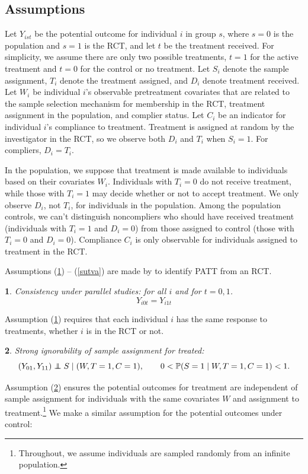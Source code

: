 \documentclass[12pt]{article}
\makeatletter
\newtheorem*{assumption*}{\assumptionnumber}
\providecommand{\assumptionnumber}{}
\newenvironment{assumption}[2]
 {%
  \renewcommand{\assumptionnumber}{Assumption #1}%
  \begin{assumption*}%
  \protected@edef\@currentlabel{#1}%
 }
 {%
  \end{assumption*}
 }
\newcommand{\pr}{\mathbb{P}} %
\newcommand\independent{\protect\mathpalette{\protect\independenT}{\perp}}
\def\independenT#1#2{\mathrel{\rlap{$#1#2$}\mkern2mu{#1#2}}}
\makeatother
\begin{document}
\subsection{Assumptions} 
Let $Y_{ist}$ be the potential outcome for individual $i$ in group $s$, where $s=0$ is the population and $s=1$ is the RCT, and let $t$ be the treatment received.  For simplicity, we assume there are only two possible treatments, $t=1$ for the active treatment and $t=0$ for the control or no treatment.  Let $S_i$ denote the sample assignment, $T_i$ denote the treatment assigned, and $D_i$ denote treatment received. Let $W_i$ be individual $i$'s observable pretreatment covariates that are related to the sample selection mechanism for membership in the RCT, treatment assignment in the population, and complier status.  Let $C_i$ be an indicator for individual $i$'s compliance to treatment.  Treatment is assigned at random by the investigator in the RCT, so we observe both $D_i$ and $T_i$ when $S_i = 1$.  For compliers, $D_i = T_i$.  

In the population, we suppose that treatment is made available to individuals based on their covariates $W_i$.  Individuals with $T_i = 0$ do not receive treatment, while those with $T_i=1$ may decide whether or not to accept treatment.  We only observe $D_i$, not $T_i$, for individuals in the population.  Among the population controls, we can't distinguish noncompliers who should have received treatment (individuals with $T_i=1$ and $D_i = 0$) from those assigned to control (those with $T_i = 0$ and $D_i = 0$).  Compliance $C_i$ is only observable for individuals assigned to treatment in the RCT. 


Assumptions (\ref{consistency}) -- (\ref{sutva}) are made by \cite{Hartman} to identify PATT from an RCT. 

\begin{assumption}{1}{}\label{consistency}
Consistency under parallel studies: for all $i$ and for $t=0, 1$.
$$Y_{i0t} = Y_{i1t}$$
\end{assumption}

\noindent Assumption (\ref{consistency}) requires that each individual $i$ has the same response to treatments, whether $i$ is in the RCT or not. 

\begin{assumption}{2}{}\label{si_treat}
Strong ignorability of sample assignment for treated:
\begin{equation*}
(Y_{01}, Y_{11}) \independent S \mid (W, T=1,C=1), \qquad 0 < \pr(S=1 \mid W, T=1,C=1) <1.
\end{equation*}
\end{assumption}
\noindent Assumption (\ref{si_treat}) ensures the potential outcomes for treatment are independent of sample assignment for individuals with the same covariates $W$ and assignment to treatment.\footnote{Throughout, we assume individuals are sampled randomly from an infinite population.} We make a similar assumption for the potential outcomes under control: 
\end{document}

